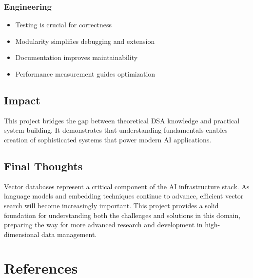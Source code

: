 \documentclass[12pt,a4paper]{article}
\begin{document}
\subsubsection{Engineering}
\begin{itemize}
    \item Testing is crucial for correctness
    \item Modularity simplifies debugging and extension
    \item Documentation improves maintainability
    \item Performance measurement guides optimization
\end{itemize}

\subsection{Impact}
This project bridges the gap between theoretical DSA knowledge and practical system building. It demonstrates that understanding fundamentals enables creation of sophisticated systems that power modern AI applications.

\subsection{Final Thoughts}
Vector databases represent a critical component of the AI infrastructure stack. As language models and embedding techniques continue to advance, efficient vector search will become increasingly important. This project provides a solid foundation for understanding both the challenges and solutions in this domain, preparing the way for more advanced research and development in high-dimensional data management.

\section{References}
\end{document}
